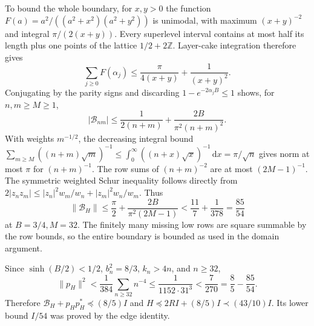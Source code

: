 \documentclass[11pt]{article}
\newcommand{\dd}{\,\mathrm d}
\newcommand{\norm}[1]{\lVert#1\rVert}
\begin{document}
To bound the whole boundary, for $x,y>0$ the function
$F(a)=a^2/((a^2+x^2)(a^2+y^2))$ is unimodal, with maximum $(x+y)^{-2}$ and integral $\pi/(2(x+y))$. Every superlevel interval contains at most half its length plus one points of the lattice $1/2+2\mathbb Z$. Layer-cake integration therefore gives
\[
 \sum_{j\ge0}F(\alpha_j)\le\frac\pi{4(x+y)}+\frac1{(x+y)^2}.
\]
Conjugating by the parity signs and discarding $1-e^{-2\alpha_jB}\le1$ shows, for $n,m\ge M\ge1$,
\[
 |\mathcal B_{nm}|\le\frac1{2(n+m)}+\frac{2B}{\pi^2(n+m)^2}.
\]
With weights $m^{-1/2}$, the decreasing integral bound
$\sum_{m\ge M}((n+m)\sqrt m)^{-1}\le\int_0^\infty((n+x)\sqrt x)^{-1}\dd x=\pi/\sqrt n$
gives norm at most $\pi$ for $(n+m)^{-1}$. The row sums of $(n+m)^{-2}$ are at most $(2M-1)^{-1}$. The symmetric weighted Schur inequality follows directly from $2|z_nz_m|\le|z_n|^2w_m/w_n+|z_m|^2w_n/w_m$. Thus
\[
 \norm{\mathcal B_H}\le\frac\pi2+\frac{2B}{\pi^2(2M-1)}
 <\frac{11}7+\frac1{378}=\frac{85}{54}
\]
at $B=3/4,M=32$. The finitely many missing low rows are square summable by the row bounds, so the entire boundary is bounded as used in the domain argument.

Since $\sinh(B/2)<1/2$, $b_n^2=8/3$, $k_n>4n$, and $n\ge32$,
\[
 \norm{p_H}^2<\frac1{384}\sum_{n\ge32}n^{-4}
 \le\frac1{1152\cdot31^3}<\frac7{270}=\frac85-\frac{85}{54}.
\]
Therefore $\mathcal B_H+p_Hp_H^*\preceq(8/5)I$ and
$H\preceq2RI+(8/5)I\prec(43/10)I$. Its lower bound $I/54$ was proved by the edge identity.
\end{document}
